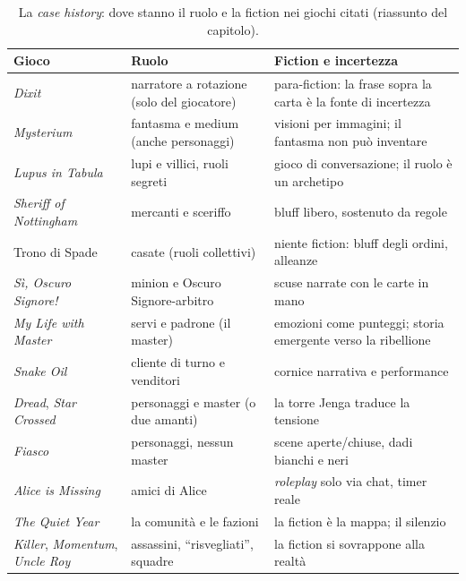 \begin{table}[htbp]
\centering
\small
\caption{La \emph{case history}: dove stanno il ruolo e la fiction nei giochi citati
(riassunto del capitolo).}
\label{a16:tab:case}
\begin{tabular}{@{}>{\raggedright\arraybackslash}p{3.0cm}>{\raggedright\arraybackslash}p{4.4cm}>{\raggedright\arraybackslash}p{6.2cm}@{}}
\toprule
\textbf{Gioco} & \textbf{Ruolo} & \textbf{Fiction e incertezza} \\
\midrule
\emph{Dixit} & narratore a rotazione (solo del giocatore) & para-fiction: la frase sopra la
  carta è la fonte di incertezza \\
\emph{Mysterium} & fantasma e medium (anche personaggi) & visioni per immagini; il fantasma
  non può inventare \\
\emph{Lupus in Tabula} & lupi e villici, ruoli segreti & gioco di conversazione; il ruolo è
  un archetipo \\
\emph{Sheriff of Nottingham} & mercanti e sceriffo & bluff libero, sostenuto da regole \\
Trono di Spade & casate (ruoli collettivi) & niente fiction: bluff degli ordini, alleanze \\
\emph{Sì, Oscuro Signore!} & minion e Oscuro Signore-arbitro & scuse narrate con le carte in
  mano \\
\emph{My Life with Master} & servi e padrone (il master) & emozioni come punteggi; storia
  emergente verso la ribellione \\
\emph{Snake Oil} & cliente di turno e venditori & cornice narrativa e performance \\
\emph{Dread}, \emph{Star Crossed} & personaggi e master (o due amanti) & la torre Jenga
  traduce la tensione \\
\emph{Fiasco} & personaggi, nessun master & scene aperte/chiuse, dadi bianchi e neri \\
\emph{Alice is Missing} & amici di Alice & \emph{roleplay} solo via chat, timer reale \\
\emph{The Quiet Year} & la comunità e le fazioni & la fiction è la mappa; il silenzio \\
\emph{Killer}, \emph{Momentum}, \emph{Uncle Roy} & assassini, ``risvegliati'', squadre &
  la fiction si sovrappone alla realtà \\
\bottomrule
\end{tabular}
\end{table}

